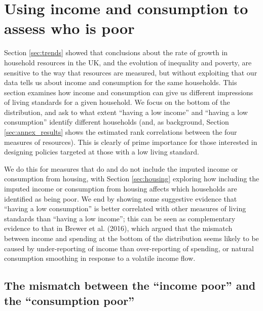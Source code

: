 \section{Using income and consumption to assess who is poor}\label{sec:composition}


Section \ref{sec:trends} showed that conclusions about the rate of growth in household resources in the UK, and the evolution of inequality and poverty, are sensitive to the way that resources are measured, but without exploiting that our data tells us about income and consumption for the same households. This section examines how income and consumption can give us different impressions of living standards for a given household.  We focus on the bottom of the distribution, and ask to what extent ``having a low income'' and ``having a low consumption'' identify different households (and, as background, Section \ref{sec:annex_results} shows the estimated rank correlations between the four measures of resources). This is clearly of prime importance for those interested in designing policies targeted at those with a low living standard. 

We do this for measures that do and do not include the imputed income or consumption from housing, with Section \ref{sec:housing} exploring how including the imputed income or consumption from housing affects which households are identified as being poor. We end by showing some suggestive evidence that ``having a low consumption'' is better correlated with other measures of living standards than ``having a low income''; this can be seen as complementary evidence to that in Brewer et al. (2016), which argued that the mismatch between income and spending at the bottom of the distribution seems likely to be caused by under-reporting of income than over-reporting of spending, or natural consumption smoothing in response to a volatile income flow. 


\subsection{The mismatch between the ``income poor'' and the ``consumption poor''}\label{subsec:mismatch}

